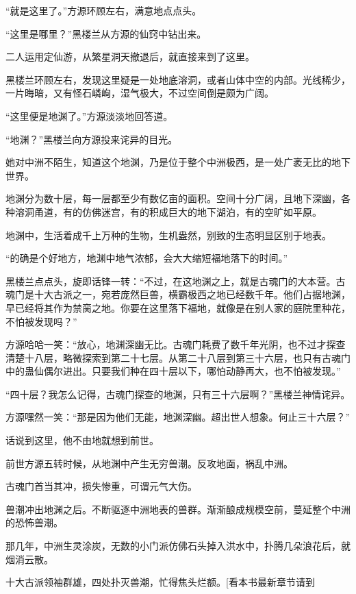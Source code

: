 
\begin{this_body}

“就是这里了。”方源环顾左右，满意地点点头。

“这里是哪里？”黑楼兰从方源的仙窍中钻出来。

二人运用定仙游，从繁星洞天撤退后，就直接来到了这里。

黑楼兰环顾左右，发现这里疑是一处地底溶洞，或者山体中空的内部。光线稀少，一片晦暗，又有怪石嶙峋，湿气极大，不过空间倒是颇为广阔。

“这里便是地渊了。”方源淡淡地回答道。

“地渊？”黑楼兰向方源投来诧异的目光。

她对中洲不陌生，知道这个地渊，乃是位于整个中洲极西，是一处广袤无比的地下世界。

地渊分为数十层，每一层都至少有数亿亩的面积。空间十分广阔，且地下深幽，各种溶洞甬道，有的仿佛迷宫，有的积成巨大的地下湖泊，有的空旷如平原。

地渊中，生活着成千上万种的生物，生机盎然，别致的生态明显区别于地表。

“的确是个好地方，地渊中地气浓郁，会大大缩短福地落下的时间。”

黑楼兰点点头，旋即话锋一转：“不过，在这地渊之上，就是古魂门的大本营。古魂门是十大古派之一，宛若庞然巨兽，横霸极西之地已经数千年。他们占据地渊，早已经将其作为禁脔之地。你要在这里落下福地，就像是在别人家的庭院里种花，不怕被发现吗？”

方源哈哈一笑：“放心，地渊深幽无比。古魂门耗费了数千年光阴，也不过才探查清楚十八层，略微探索到第二十七层。从第二十八层到第三十六层，也只有古魂门中的蛊仙偶尔进出。只要我们种在四十层以下，哪怕动静再大，也不怕被发现。”

“四十层？我怎么记得，古魂门探查的地渊，只有三十六层啊？”黑楼兰神情诧异。

方源嘿然一笑：“那是因为他们无能，地渊深幽。超出世人想象。何止三十六层？”

话说到这里，他不由地就想到前世。

前世方源五转时候，从地渊中产生无穷兽潮。反攻地面，祸乱中洲。

古魂门首当其冲，损失惨重，可谓元气大伤。

兽潮冲出地渊之后。不断驱逐中洲地表的兽群。渐渐酿成规模空前，蔓延整个中洲的恐怖兽潮。

那几年，中洲生灵涂炭，无数的小门派仿佛石头掉入洪水中，扑腾几朵浪花后，就烟消云散。

十大古派领袖群雄，四处扑灭兽潮，忙得焦头烂额。[看本书最新章节请到


\end{this_body}

